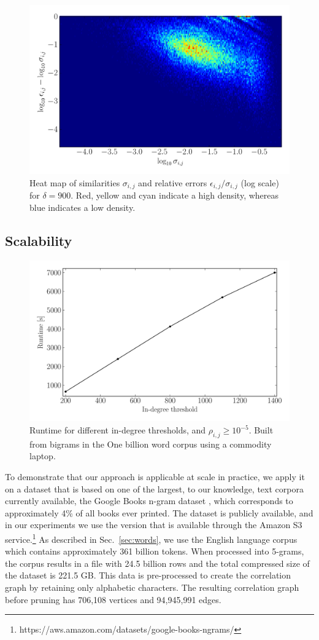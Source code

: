 \documentclass{kais}
\newcommand{\rn}[1]{\rho_{#1}}
\begin{document}
\begin{figure}
\centerline{\includegraphics[width=0.75\columnwidth]{figures/1446451652-relative_error-heatmap-900.pdf}}
\caption{Heat map of similarities $\sigma_{i,j}$ and relative errors $\epsilon_{i,j}/\sigma_{i,j}$ (log scale)
for $\delta = 900$. Red, yellow and cyan indicate a high density, whereas blue indicates a low density.}
\label{fig:error-heatmap}
\end{figure}

\subsection{Scalability}
\label{sec: scalability}

\begin{figure}
\centerline{\includegraphics[width=0.75\columnwidth]{figures/billion-rt-2.pdf}}
\caption{Runtime for different in-degree 
thresholds, and $\rn{i,j} \geq 10^{-5}$. Built from bigrams in the One billion word corpus using a commodity laptop.}
\label{fig:billion-e-runtime}
\end{figure}

To demonstrate that our approach is applicable at scale in practice, we apply it on a dataset that is based on 
one of the largest, to our knowledge, text corpora currently available, the Google Books
n-gram dataset \cite{Michel10,Lin12}, which corresponds to approximately 4\% of all books ever printed.
The dataset is publicly available, and in our experiments we use
the version that is available through the Amazon S3 service.\footnote{https://aws.amazon.com/datasets/google-books-ngrams/}
As described in Sec.\ \ref{sec:words}, we use the English language corpus
which contains approximately 361 billion tokens. When processed into 5-grams, the corpus results in a file with 24.5 billion 
rows and the total compressed size of the dataset is 221.5 GB. This data is pre-processed to create the correlation graph by retaining
only alphabetic characters. The resulting correlation graph before pruning has 706,108 vertices and 94,945,991 edges.
\end{document}
